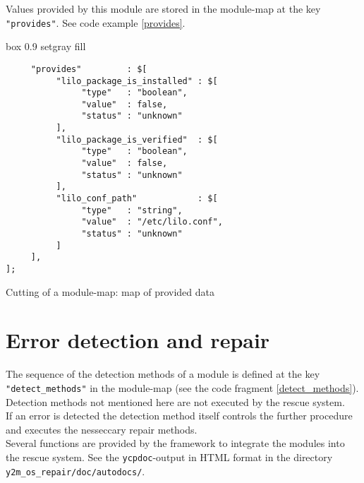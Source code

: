 Values provided by this module are stored in the module-map at the key
\verb+"provides"+. See code example \ref{provides}.

\begin{program}[h!]
\begin{boxitpara}{box 0.9 setgray fill}
{\footnotesize \begin{verbatim}
     "provides"         : $[
          "lilo_package_is_installed" : $[
               "type"   : "boolean",
               "value"  : false,
               "status" : "unknown"
          ],
          "lilo_package_is_verified"  : $[
               "type"   : "boolean",
               "value"  : false,
               "status" : "unknown"
          ],
          "lilo_conf_path"            : $[
               "type"   : "string",
               "value"  : "/etc/lilo.conf",
               "status" : "unknown"
          ]
     ],
];
\end{verbatim}}
\end{boxitpara}
\caption{Cutting of a module-map: map of provided data}
\label{provides}
\end{program}

\section{Error detection and repair}
The sequence of the detection methods of a module is defined 
at the key \verb+"detect_methods"+ in the module-map (see the code
fragment \ref{detect_methods}). Detection methods not
mentioned here are not executed by the rescue system.\\

If an error is detected the detection method itself controls the further
procedure and executes the nesseccary repair methods.\\

Several functions are provided by the framework to integrate the modules
into the rescue system. See the {\tt ycpdoc}-output in HTML format in the
directory {\tt y2m\_os\_repair/doc/autodocs/}.
